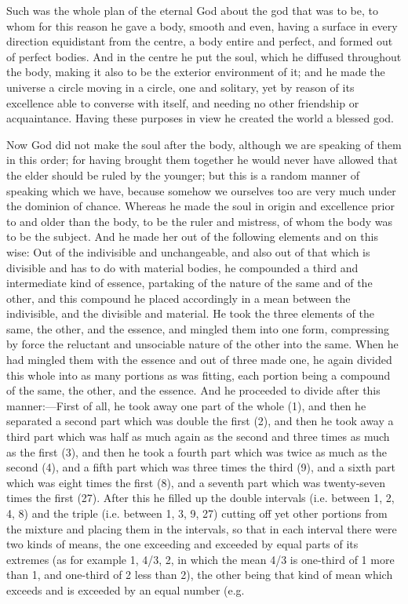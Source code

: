 \documentclass[11pt,letter]{article}
\begin{document}
\par  Such was the whole plan of the eternal God about the god that was to be, to whom for this reason he gave a body, smooth and even, having a surface in every direction equidistant from the centre, a body entire and perfect, and formed out of perfect bodies. And in the centre he put the soul, which he diffused throughout the body, making it also to be the exterior environment of it; and he made the universe a circle moving in a circle, one and solitary, yet by reason of its excellence able to converse with itself, and needing no other friendship or acquaintance. Having these purposes in view he created the world a blessed god.

\par  Now God did not make the soul after the body, although we are speaking of them in this order; for having brought them together he would never have allowed that the elder should be ruled by the younger; but this is a random manner of speaking which we have, because somehow we ourselves too are very much under the dominion of chance. Whereas he made the soul in origin and excellence prior to and older than the body, to be the ruler and mistress, of whom the body was to be the subject. And he made her out of the following elements and on this wise: Out of the indivisible and unchangeable, and also out of that which is divisible and has to do with material bodies, he compounded a third and intermediate kind of essence, partaking of the nature of the same and of the other, and this compound he placed accordingly in a mean between the indivisible, and the divisible and material. He took the three elements of the same, the other, and the essence, and mingled them into one form, compressing by force the reluctant and unsociable nature of the other into the same. When he had mingled them with the essence and out of three made one, he again divided this whole into as many portions as was fitting, each portion being a compound of the same, the other, and the essence. And he proceeded to divide after this manner:—First of all, he took away one part of the whole (1), and then he separated a second part which was double the first (2), and then he took away a third part which was half as much again as the second and three times as much as the first (3), and then he took a fourth part which was twice as much as the second (4), and a fifth part which was three times the third (9), and a sixth part which was eight times the first (8), and a seventh part which was twenty-seven times the first (27). After this he filled up the double intervals (i.e. between 1, 2, 4, 8) and the triple (i.e. between 1, 3, 9, 27) cutting off yet other portions from the mixture and placing them in the intervals, so that in each interval there were two kinds of means, the one exceeding and exceeded by equal parts of its extremes (as for example 1, 4/3, 2, in which the mean 4/3 is one-third of 1 more than 1, and one-third of 2 less than 2), the other being that kind of mean which exceeds and is exceeded by an equal number (e.g.
 
\end{document}
